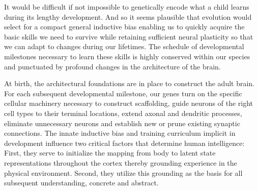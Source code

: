 It would be difficult if not impossible to genetically encode what a child learns during its lengthy development. And so it seems plausible that evolution would select for a compact general inductive bias enabling us to quickly acquire the basic skills we need to survive while retaining sufficient neural plasticity so that we can adapt to changes during our lifetimes. The schedule of developmental milestones necessary to learn these skills is highly conserved within our species and punctuated by profound changes in the architecture of the brain.

At birth, the architectural foundations are in place to construct the adult brain. For each subsequent developmental milestone, our genes turn on the specific cellular machinery necessary to construct scaffolding, guide neurons of the right cell types to their terminal locations, extend axonal and dendritic processes, eliminate unnecessary neurons and establish new or prune existing synaptic connections. The innate inductive bias and training curriculum implicit in development influence two critical factors that determine human intelligence: First, they serve to initialize the mapping from body to latent state representations throughout the cortex thereby grounding experience in the physical environment. Second, they utilize this grounding as the basis for all subsequent understanding, concrete and abstract. 

